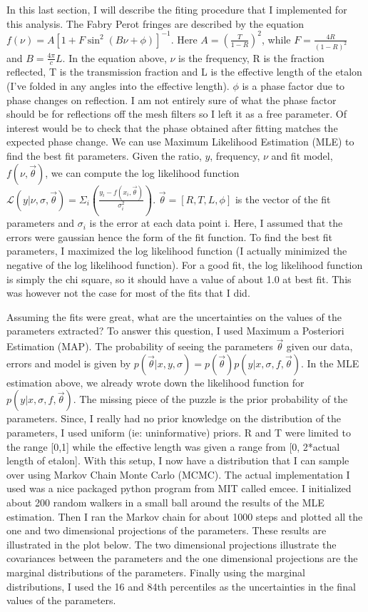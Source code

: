 \documentclass[12pt]{article}
\begin{document}
In this last section, I will describe the fiting procedure that I implemented for this analysis. The Fabry Perot fringes are described by the equation $f(\nu) = A \left[1 + F \sin^2\left(B \nu + \phi\right)\right]^{-1}$. Here $A = \left(\frac{T}{1-R}\right)^2$, while $F = \frac{4 R}{(1- R)^2}$ and $B = \frac{4 \pi}{c} L$. In the equation above, $\nu$ is the frequency, R is the fraction reflected, T is the transmission fraction and L is the effective length of the etalon (I've folded in any angles into the effective length). $\phi$ is a phase factor due to phase changes on reflection. I am not entirely sure of what the phase factor should be for reflections off the mesh filters so I left it as a free parameter. Of interest would be to check that the phase obtained after fitting matches the expected phase change.
We can use Maximum Likelihood Estimation (MLE) to find the best fit parameters. Given the ratio, $y$, frequency, $\nu$ and fit model, $f(\nu, \vec{\theta})$, we can compute the log likelihood function $\mathcal{L}\left(y| \nu,\sigma, \vec{\theta}\right) = \Sigma_{i} \left(\frac{y_i - f(x_i, \vec{\theta})}{\sigma^2_i}\right)$. $\vec{\theta} = [R, T, L, \phi]$ is the vector of the fit parameters and $\sigma_i$ is the error at each data point i. Here, I assumed that the errors were gaussian hence the form of the fit function. To find the best fit parameters, I maximized the log likelihood function (I actually minimized the negative of the log likelihood function). For a good fit, the log likelihood function is simply the chi square, so it should have a value of about 1.0 at best fit. This was however not the case for most of the fits that I did.

Assuming the fits were great, what are the uncertainties on the values of the parameters extracted? To answer this question, I used Maximum a Posteriori Estimation (MAP). The probability of seeing the parameters $\vec{\theta}$ given our data, errors and model is given by $p (\vec{\theta}| x,y, \sigma) = p (\vec{\theta}) p (y| x, \sigma, f, \vec{\theta})$. In the MLE estimation above, we already wrote down the likelihood function for $p (y| x, \sigma, f, \vec{\theta})$. The missing piece of the puzzle is the prior probability of the parameters. Since, I really had no prior knowledge on the distribution of the parameters, I used uniform (ie: uninformative) priors. R and T were limited to the range [0,1] while the effective length was given a range from [0, 2*actual length of etalon]. With this setup, I now have a distribution that I can sample over using Markov Chain Monte Carlo (MCMC). The actual implementation I used was a nice packaged python program from MIT called emcee. I initialized about 200 random walkers in a small ball around the results of the MLE estimation. Then I ran the Markov chain for about 1000 steps and plotted all the one and two dimensional projections of the parameters. These results are illustrated in the plot below. The two dimensional projections illustrate the covariances between the parameters and the one dimensional projections are the marginal distributions of the parameters. Finally using the marginal distributions, I used the 16 and 84th percentiles as the uncertainties in the final values of the parameters.
\end{document}
